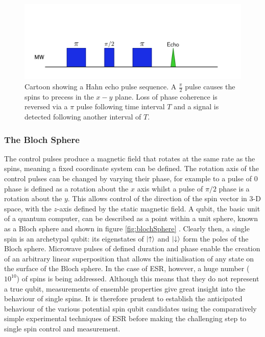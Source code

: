 \begin{figure}
\centering
\includegraphics[width = \columnwidth]{Figures/hahnEcho.pdf}
\caption[Hahn echo sequence]{Cartoon showing a Hahn echo pulse sequence. A $\frac{\pi}{2}$ pulse causes the spins to precess in the $x-y$ plane. Loss of phase coherence is reversed via a $\pi$ pulse following time interval $T$ and a signal is detected following another interval of $T$.}
\label{fig:HahnEcho}
\end{figure}


\subsubsection{The Bloch Sphere}

The control pulses produce a magnetic field that rotates at the same rate as the spins, meaning a fixed coordinate system can be defined.
The rotation axis of the control pulses can be changed by varying their phase, for example to a pulse of 0 phase is defined as a rotation about the $x$ axis whilst a pulse of $\pi/2$ phase is a rotation about the $y$.
This allows control of the direction of the spin vector in 3-D space, with the $z$-axis defined by the static magnetic field.  
A qubit, the basic unit of a quantum computer, can be described as a point within a unit sphere, known as a Bloch sphere and shown in figure \ref{fig:blochSphere} \cite{Nielsen:2011:QCQ:1972505}.
Clearly then, a single spin is an archetypal qubit: its eigenstates of $\ket{\uparrow}$ and $\ket{\downarrow}$ form the poles of the Bloch sphere. 
Microwave pulses of defined duration and phase enable the creation of an arbitrary linear superposition that allows the initialisation of any state on the surface of the Bloch sphere.
In the case of ESR, however, a huge number ($10^{10}$) of spins is being addressed. 
Although this means that they do not represent a true qubit, measurements of ensemble properties give great insight into the behaviour of single spins.
It is therefore prudent to establish the anticipated behaviour of the various potential spin qubit candidates using the comparatively simple experimental techniques of ESR before making the challenging step to single spin control and measurement. 

